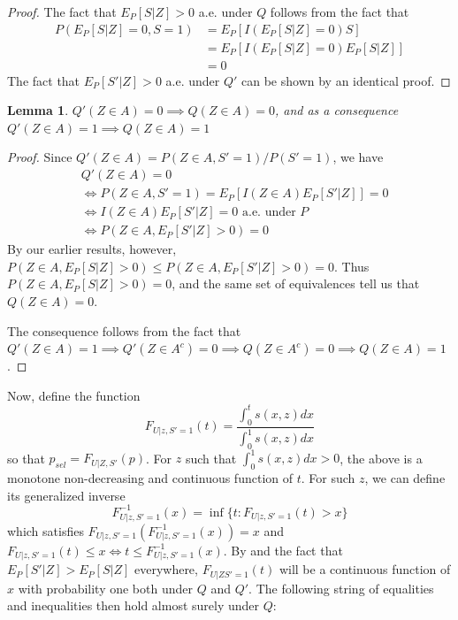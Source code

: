 \documentclass{article}
\newtheorem{lemma}{Lemma}
\begin{document}
\begin{appendix}
\begin{proof}
    The fact that $E_P[S|Z]> 0$ a.e. under $Q$ follows from the fact that 
    \begin{align*}
        P(E_P[S| Z] = 0, S=1) &= E_P[ I(E_P[S| Z] = 0) S] \\
                            &= E_P[ I(E_P[S| Z] = 0) E_P[S |Z]] \\
                            &= 0
    \end{align*}
    The fact that $E_P[S'|Z] > 0$ a.e. under $Q'$ can be shown by an identical proof. 
    
\end{proof}


\begin{lemma}
    \label{lem:switch}
    $Q'(Z \in A) = 0 \implies Q(Z \in A) = 0$, and as a consequence  $Q'(Z \in A) = 1 \implies Q(Z \in A) = 1$
\end{lemma}

\begin{proof} 
    Since $Q'(Z \in A) = P(Z \in A, S'=1)/P(S'=1)$, we have
    \begin{align*}
        &Q'(Z \in A) = 0 \\
        &\iff P(Z \in A, S'=1) = E_P[ I(Z \in A) E_P[ S' |Z]] = 0\\
        &\iff I(Z \in A) E_P[ S' |Z] = 0 \text{ a.e. under } P \\
        &\iff P(Z \in A, E_P[S'|Z]>0) = 0 
    \end{align*} 
    By our earlier results, however,  $P(Z \in A, E_P[S|Z]>0) \leq P(Z \in A, E_P[S'|Z]>0) = 0$. Thus  $P(Z \in A, E_P[S|Z]>0) =0$, and the same set of equivalences tell us that $Q(Z \in A) = 0$. 

    The consequence follows from the fact that $Q'(Z \in A) = 1 \implies Q'(Z \in A^c) = 0 \implies Q(Z \in A^c) = 0 \implies Q(Z \in A) = 1$. 
\end{proof}


Now, define the function 
\begin{equation*}
    F_{U|z, S'=1}(t) = \frac{\int_0^t s(x, z) dx }{\int_0^1 s(x, z) dx}
\end{equation*}
so that $p_{sel} = F_{U| Z, S'}(p)$. For $z$ such that $\int_0^1 s(x, z) dx > 0$, the above is a monotone non-decreasing and continuous function of $t$. For such $z$, we can define its generalized inverse
\begin{equation*}
    F^{-1}_{U |z, S'=1}(x)  = \inf \{t : F_{U |z, S' = 1}(t) > x  \}
\end{equation*}
which satisfies $F_{U|z, S' =1}(F^{-1}_{U |z, S'=1}(x)) = x$ and $F_{U | z, S' = 1}(t) \leq x \iff t \leq  F^{-1}_{U | z, S' = 1}(x)$. By  and the fact that $E_P[S' | Z] > E_P[S|Z]$ everywhere, $F_{U|Z S'=1}(t)$ will be a continuous function of $x$ with probability one both under $Q$ and $Q'$. The following string of equalities and inequalities then hold almost surely under $Q$:


\end{appendix}
\end{document}
